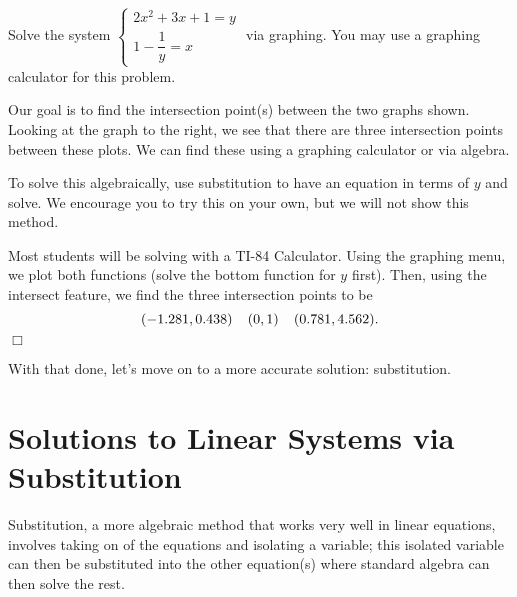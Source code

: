\documentclass[../book.tex]{subfiles}
\begin{document}
\begin{example}
Solve the system $\begin{cases} 2x^2+3x+1=y \\ 1-\dfrac{1}{y}=x \end{cases}$ via graphing.  You may use a graphing calculator for this problem.
\end{example}
\begin{solution}
Our goal is to find the intersection point(s) between the two graphs shown.  Looking at the graph to the right, we see that there are three intersection points between these plots.  We can find these using a graphing calculator or via algebra.  

To solve this algebraically, use substitution to have an equation in terms of $y$ and solve.  We encourage you to try this on your own, but we will not show this method.  

Most students will be solving with a TI-84 Calculator.  Using the graphing menu, we plot both functions (solve the bottom function for $y$ first).  Then, using the intersect feature, we find the three intersection points to be $$(-1.281,0.438) \hspace{0.15in} (0,1) \hspace{0.15in} (0.781, 4.562).$$ $\Box$
\end{solution}
With that done, let's move on to a more accurate solution: substitution.
\section{Solutions to Linear Systems via Substitution}
Substitution, a more algebraic method that works very well in linear equations, involves taking on of the equations and isolating a variable; this isolated variable can then be substituted into the other equation(s) where standard algebra can then solve the rest.  
\end{document}
